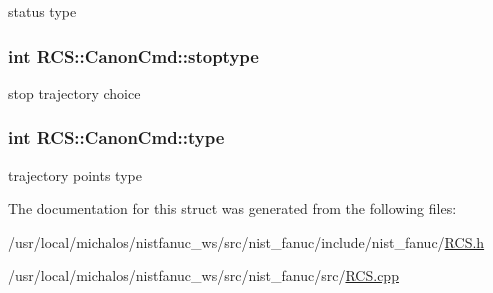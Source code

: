 status type \hypertarget{structRCS_1_1CanonCmd_ad0851df84e55dd91a0a3ae7b5759241e}{
\subsubsection[{stoptype}]{\setlength{\rightskip}{0pt plus 5cm}int R\-C\-S\-::\-Canon\-Cmd\-::stoptype}}\label{structRCS_1_1CanonCmd_ad0851df84e55dd91a0a3ae7b5759241e}
stop trajectory choice \hypertarget{structRCS_1_1CanonCmd_a490f268f30dc70285dbde1c4bff0000f}{
\subsubsection[{type}]{\setlength{\rightskip}{0pt plus 5cm}int R\-C\-S\-::\-Canon\-Cmd\-::type}}\label{structRCS_1_1CanonCmd_a490f268f30dc70285dbde1c4bff0000f}
trajectory points type 

The documentation for this struct was generated from the following files\-:\begin{DoxyCompactItemize}
\item 
/usr/local/michalos/nistfanuc\-\_\-ws/src/nist\-\_\-fanuc/include/nist\-\_\-fanuc/\hyperlink{RCS_8h}{R\-C\-S.\-h}\item 
/usr/local/michalos/nistfanuc\-\_\-ws/src/nist\-\_\-fanuc/src/\hyperlink{RCS_8cpp}{R\-C\-S.\-cpp}\end{DoxyCompactItemize}
